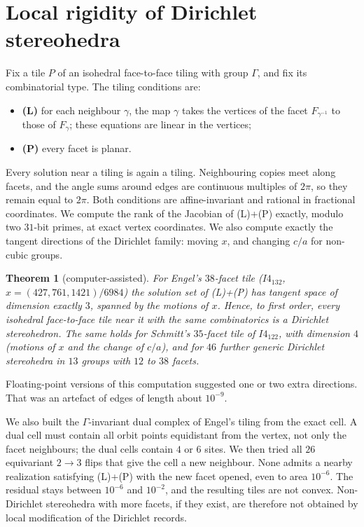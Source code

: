 \documentclass[11pt]{amsart}
\newtheorem{theorem}{Theorem}
\theoremstyle{definition}
\begin{document}
\section{Local rigidity of Dirichlet stereohedra}
Fix a tile $P$ of an isohedral face-to-face tiling with group $\Gamma$, and fix its combinatorial type. The tiling
conditions are:
\begin{itemize}[leftmargin=1.5em]
\item \textbf{(L)} for each neighbour $\gamma$, the map $\gamma$ takes the vertices of the facet $F_{\gamma^{-1}}$ to those of
$F_\gamma$; these equations are linear in the vertices;
\item \textbf{(P)} every facet is planar.
\end{itemize}
Every solution near a tiling is again a tiling. Neighbouring copies meet along facets, and the angle sums around edges
are continuous multiples of $2\pi$, so they remain equal to $2\pi$. Both conditions are affine-invariant and rational in
fractional coordinates. We compute the rank of the Jacobian of (L)+(P) exactly, modulo two $31$-bit primes, at exact
vertex coordinates. We also compute exactly the tangent directions of the Dirichlet family: moving $x$, and changing
$c/a$ for non-cubic groups.

\begin{theorem}[computer-assisted]
For Engel's $38$-facet tile ($I4_132$, $x=(427,761,1421)/6984$) the solution set of (L)+(P) has tangent space of
dimension exactly $3$, spanned by the motions of $x$. Hence, to first order, every isohedral face-to-face tile near it
with the same combinatorics is a Dirichlet stereohedron. The same holds for Schmitt's $35$-facet tile of $I4_122$, with
dimension $4$ (motions of $x$ and the change of $c/a$), and for $46$ further generic Dirichlet stereohedra in $13$ groups
with $12$ to $38$ facets.
\end{theorem}

Floating-point versions of this computation suggested one or two extra directions. That was an artefact of edges of
length about $10^{-9}$.

We also built the $\Gamma$-invariant dual complex of Engel's tiling from the exact cell. A dual cell must contain all
orbit points equidistant from the vertex, not only the facet neighbours; the dual cells contain $4$ or $6$ sites. We then
tried all $26$ equivariant $2\to3$ flips that give the cell a new neighbour. None admits a nearby realization satisfying
(L)+(P) with the new facet opened, even to area $10^{-6}$. The residual stays between $10^{-6}$ and $10^{-2}$, and the
resulting tiles are not convex. Non-Dirichlet stereohedra with more facets, if they exist, are therefore not obtained by
local modification of the Dirichlet records.
\end{document}
